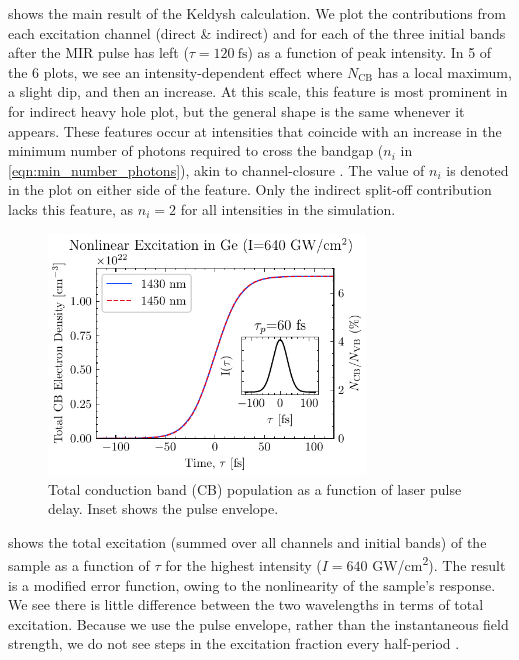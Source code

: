  shows the main result of the Keldysh calculation. We plot the contributions from each excitation channel (direct \& indirect) and for each of the three initial bands after the MIR pulse has left ($\tau = 120 \ \textrm{fs}$) as a function of peak intensity. In 5 of the 6 plots, we see an intensity-dependent effect where $N_{\textrm{CB}}$ has a local maximum, a slight dip, and then an increase. At this scale, this feature is most prominent in for indirect heavy hole plot, but the general shape is the same whenever it appears. These features occur at intensities that coincide with an increase in the minimum number of photons required to cross the bandgap ($n_i$ in \cref{eqn:min_number_photons}), akin to channel-closure \cite{shcheblanovNonlinearPhotoionizationTransparent2017}. The value of $n_i$ is denoted in the plot on either side of the feature. Only the indirect split-off contribution lacks this feature, as $n_i=2$ for all intensities in the simulation.

\begin{figure}
	\centering
	\includegraphics[width=0.75\textwidth]{figures/chap4/Total_CB_dens_vs_Time.pdf}
	\caption{Total conduction band (CB) population as a function of laser pulse delay. Inset shows the pulse envelope.}
	\label{fig:Total_CB_dens_vs_Time}
\end{figure}

 shows the total excitation (summed over all channels and initial bands) of the sample as a function of $\tau$ for the highest intensity ($I = 640$ GW/cm\textsuperscript{2}). The result is a modified error function, owing to the nonlinearity of the sample's response. We see there is little difference between the two wavelengths in terms of total excitation. Because we use the pulse envelope, rather than the instantaneous field strength, we do not see steps in the excitation fraction every half-period \cite{schultzeAttosecondBandgapDynamics2014}.

